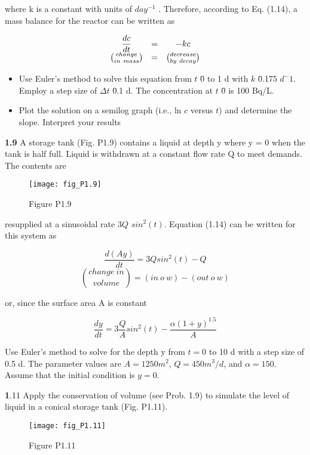 \documentclass[../main.tex]{subfiles}
\begin{document}
\begin{multicols}{2}
where k is a constant with units of $day^{-1}$
. Therefore, according to Eq. (1.14), a mass balance for the reactor can be
written as

\[ \begin{array}{c c c}
	\dfrac{dc}{dt} & =& -kc\\
	\binom{change}{in \ mass} & =& \binom{decrease}{by \ decay} 
	
\end{array} \]

\begin{itemize}
	\item Use Euler's method to solve this equation from $t$ \= 0 to
	1 d with $k$ \= 0.175 $d^-1$. Employ a step size of $\Delta t$ \= 0.1 d.
	The concentration at $t$ \= 0 is 100 Bq/L.
	\item Plot the solution on a semilog graph (i.e., ln $c$ versus $t$)
	and determine the slope. Interpret your results
\end{itemize}

\textbf{1.9} A storage tank (Fig. P1.9) contains a liquid at depth y
where y = 0 when the tank is half full. Liquid is withdrawn
at a constant flow rate Q to meet demands. The contents are


\begin{figure}[H]
	\centering
	
	\texttt{[image: fig\_P1.9]}
	\caption*{Figure P1.9}
   \label{fig_P1.9}
\end{figure}

resupplied at a sinusoidal rate $3Q$ $sin^2(t)$. Equation (1.14)
can be written for this system as

$$ \dfrac{d(Ay)}{dt}=3Q sin^2(t)-Q$$
$$ \binom{change \ in}{volume} = (in \ o \ w) - (out \ o \ w) $$

or, since the surface area A is constant

$$\dfrac{dy}{dt}=3\dfrac{Q}{A}sin^2(t)- \dfrac{\alpha(1+y)^{1.5}}{A} $$

Use Euler's method to solve for the depth y from $t = 0$ to
10 d with a step size of 0.5 d. The parameter values are $A =
1250 m^2$, $Q = 450 m^3/d$, and $\alpha = 150$. Assume that the initial condition is $y = 0$.

\textbf1.11 Apply the conservation of volume (see Prob. 1.9) to simulate the level of liquid in a conical storage tank (Fig. P1.11).

\begin{figure}[H]
	\centering
	
	\texttt{[image: fig\_P1.11]}
	\caption*{Figure P1.11}
   \label{fig_P1.9}
\end{figure}


\end{multicols}
\end{document}
